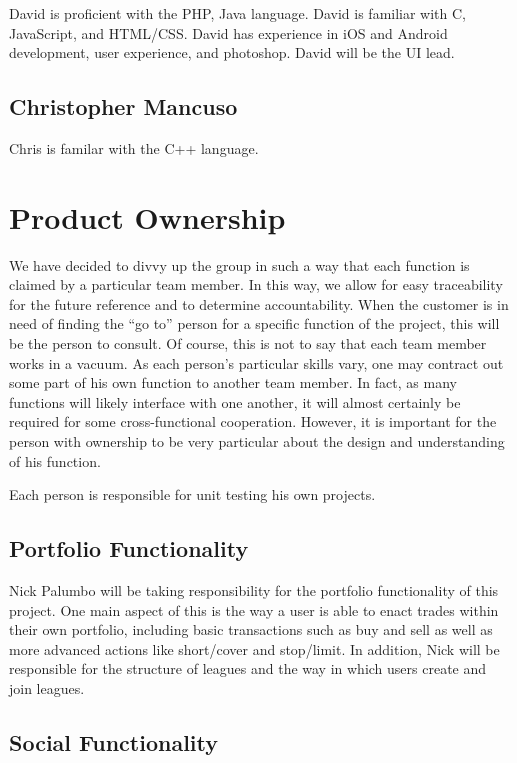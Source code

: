\documentclass[11pt,letterpaper,oneside]{memoir}
\begin{document}
David is proficient with the PHP, Java language. David is familiar with C, JavaScript, and HTML/CSS.
David has experience in iOS and Android development, user experience, and photoshop.  David will be
the UI lead.

\section{Christopher Mancuso}

Chris is familar with the C++ language.

\chapter{Product Ownership}

We have decided to divvy up the group in such a way that each function is claimed by a
particular team member. In this way, we allow for easy traceability for the future reference
and to determine accountability. When the customer is in need of finding the ``go to'' person for
a specific function of the project, this will be the person to consult. Of course, this
is not to say that each team member works in a vacuum. As each person's particular skills vary,
one may contract out some part of his own function to another team member. In fact, as many
functions will likely interface with one another, it will almost certainly be required for some
cross-functional cooperation. However, it is important for the person with ownership to be very
particular about the design and understanding of his function.

Each person is responsible for unit testing his own projects.

\section{Portfolio Functionality}
Nick Palumbo will be taking responsibility for the portfolio functionality of this project. One main
aspect of this is the way a user is able to enact trades within their own portfolio, including basic
transactions such as buy and sell as well as more advanced actions like short/cover and stop/limit.
In addition, Nick will be responsible for the structure of leagues and the way in which users create
and join leagues.

\section{Social Functionality}
\end{document}
